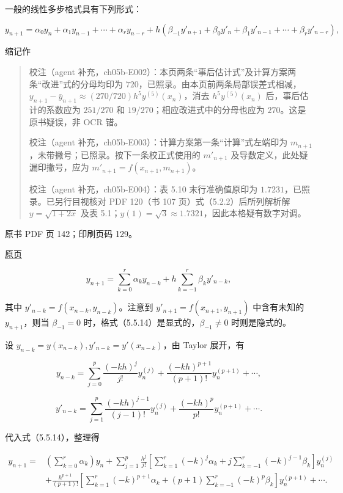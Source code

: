 一般的线性多步格式具有下列形式：

\[
y_{n+1}=\alpha_0y_n+\alpha_1y_{n-1}+\cdots+\alpha_ry_{n-r}+h(\beta_{-1}y'_{n+1}+\beta_0y'_n+\beta_1y'_{n-1}+\cdots+\beta_ry'_{n-r}),
\]

缩记作

\begin{quote}
校注（agent 补充，ch05b-E002）：本页两条``事后估计式''及计算方案两条``改进''式的分母均印为 \(720\)，已照录。由本页前两条局部误差式相减，\(y_{n+1}-\bar y_{n+1}\approx(270/720)h^5y^{(5)}(x_n)\)，消去 \(h^5y^{(5)}(x_n)\) 后，事后估计的系数应为 \(251/270\) 和 \(19/270\)；相应改进式中的分母也应为 \(270\)。这是原书疑误，非 OCR 错。

校注（agent 补充，ch05b-E003）：计算方案第一条``计算''式左端印为 \(m_{n+1}\)，未带撇号；已照录。按下一条校正式使用的 \(m'_{n+1}\) 及导数定义，此处疑漏印撇号，应为 \(m'_{n+1}=f(x_{n+1},m_{n+1})\)。

校注（agent 补充，ch05b-E004）：表 5.10 末行准确值原印为 \(1.7231\)，已照录。已另行目视核对 PDF 120（书 107 页）式（5.2.2）后所列解析解 \(y=\sqrt{1+2x}\) 及表 5.1；\(y(1)=\sqrt3\approx1.7321\)，因此本格疑有数字对调。
\end{quote}

\clearpage

原书 PDF 页 142；印刷页码 129。

\href{source-images/pdf-142.jpeg}{原页}

\[
y_{n+1}=\sum_{k=0}^r\alpha_ky_{n-k}+h\sum_{k=-1}^r\beta_ky'_{n-k},
\tag{5.5.14}
\]

其中 \(y'_{n-k}=f(x_{n-k},y_{n-k})\)。注意到 \(y'_{n+1}=f(x_{n+1},y_{n+1})\) 中含有未知的 \(y_{n+1}\)，则当 \(\beta_{-1}=0\) 时，格式（5.5.14）是显式的，\(\beta_{-1}\ne0\) 时则是隐式的。

设 \(y_{n-k}=y(x_{n-k}),y'_{n-k}=y'(x_{n-k})\)，由 Taylor 展开，有

\[
y_{n-k}=\sum_{j=0}^p\frac{(-kh)^j}{j!}y_n^{(j)}+\frac{(-kh)^{p+1}}{(p+1)!}y_n^{(p+1)}+\cdots,
\]

\[
y'_{n-k}=\sum_{j=1}^p\frac{(-kh)^{j-1}}{(j-1)!}y_n^{(j)}+\frac{(-kh)^p}{p!}y_n^{(p+1)}+\cdots.
\]

代入式（5.5.14），整理得

\[
\begin{aligned}
y_{n+1}={}&\left(\sum_{k=0}^r\alpha_k\right)y_n+\sum_{j=1}^p\frac{h^j}{j!}\left[\sum_{k=1}^r(-k)^j\alpha_k+j\sum_{k=-1}^r(-k)^{j-1}\beta_k\right]y_n^{(j)}\\
&+\frac{h^{p+1}}{(p+1)!}\left[\sum_{k=1}^r(-k)^{p+1}\alpha_k+(p+1)\sum_{k=-1}^r(-k)^p\beta_k\right]y_n^{(p+1)}+\cdots.
\end{aligned}
\tag{5.5.15}
\]

